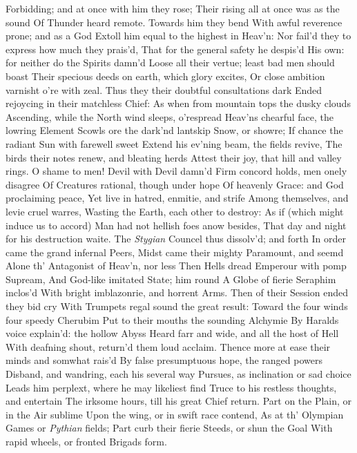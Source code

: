 \documentclass[11pt]{book}
\begin{document}
Forbidding; and at once with him they rose; 
Their rising all at once was as the sound 
Of Thunder heard remote.  Towards him they bend 
With awful reverence prone; and as a God 
Extoll him equal to the highest in Heav'n: 
Nor fail'd they to express how much they prais'd, 
That for the general safety he despis'd 
His own: for neither do the Spirits damn'd 
Loose all their vertue; least bad men should boast 
Their specious deeds on earth, which glory excites, 
Or close ambition varnisht o're with zeal. 
Thus they their doubtful consultations dark 
Ended rejoycing in their matchless Chief: 
As when from mountain tops the dusky clouds 
Ascending, while the North wind sleeps, o'respread 
Heav'ns chearful face, the lowring Element 
Scowls ore the dark'nd lantskip Snow, or showre; 
If chance the radiant Sun with farewell sweet 
Extend his ev'ning beam, the fields revive, 
The birds their notes renew, and bleating herds 
Attest their joy, that hill and valley rings. 
O shame to men!  Devil with Devil damn'd 
Firm concord holds, men onely disagree 
Of Creatures rational, though under hope 
Of heavenly Grace: and God proclaiming peace, 
Yet live in hatred, enmitie, and strife 
Among themselves, and levie cruel warres, 
Wasting the Earth, each other to destroy: 
As if (which might induce us to accord) 
Man had not hellish foes anow besides, 
That day and night for his destruction waite. 
\quad The \textit{Stygian} Councel thus dissolv'd; and forth 
In order came the grand infernal Peers, 
Midst came their mighty Paramount, and seemd 
Alone th' Antagonist of Heav'n, nor less 
Then Hells dread Emperour with pomp Supream, 
And God-like imitated State; him round 
A Globe of fierie Seraphim inclos'd 
With bright imblazonrie, and horrent Arms. 
Then of their Session ended they bid cry 
With Trumpets regal sound the great result: 
Toward the four winds four speedy Cherubim 
Put to their mouths the sounding Alchymie 
By Haralds voice explain'd: the hollow Abyss 
Heard farr and wide, and all the host of Hell 
With deafning shout, return'd them loud acclaim. 
Thence more at ease their minds and somwhat rais'd 
By false presumptuous hope, the ranged powers 
Disband, and wandring, each his several way 
Pursues, as inclination or sad choice 
Leads him perplext, where he may likeliest find 
Truce to his restless thoughts, and entertain 
The irksome hours, till his great Chief return. 
Part on the Plain, or in the Air sublime 
Upon the wing, or in swift race contend, 
As at th' Olympian Games or \textit{Pythian} fields; 
Part curb their fierie Steeds, or shun the Goal 
With rapid wheels, or fronted Brigads form. 
\end{document}
